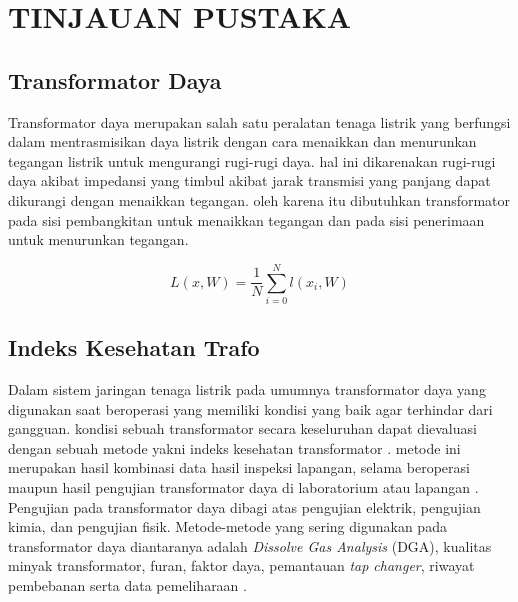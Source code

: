 \chapter{TINJAUAN PUSTAKA}
\label{BAB2:tinjauan}
\section{Transformator Daya}

Transformator daya merupakan salah satu peralatan tenaga listrik yang berfungsi dalam mentrasmisikan daya listrik dengan cara menaikkan dan menurunkan tegangan listrik untuk mengurangi rugi-rugi daya. hal ini dikarenakan rugi-rugi daya akibat impedansi yang timbul akibat jarak transmisi yang panjang dapat dikurangi dengan menaikkan tegangan. oleh karena itu dibutuhkan transformator pada sisi pembangkitan untuk menaikkan tegangan dan pada sisi penerimaan untuk menurunkan tegangan.



\begin{equation}
  L(x,W)= \frac{1}{N}\sum\limits_{i=0}^{N} l(x_i,W)   
  \label{func:loss}
\end{equation}

\section{Indeks Kesehatan Trafo}
Dalam sistem jaringan tenaga listrik pada umumnya transformator daya yang digunakan saat beroperasi yang memiliki kondisi yang baik agar terhindar dari gangguan. kondisi sebuah transformator secara keseluruhan dapat dievaluasi dengan sebuah metode yakni indeks kesehatan transformator \cite{nurcahyanto2019analysis}. metode ini merupakan hasil kombinasi data hasil inspeksi lapangan, selama beroperasi maupun hasil pengujian transformator daya di laboratorium atau lapangan \cite{ortiz2016health}. Pengujian pada transformator daya dibagi atas pengujian elektrik, pengujian kimia, dan pengujian fisik. Metode-metode yang sering digunakan pada transformator daya diantaranya adalah \textit{Dissolve Gas Analysis} (DGA), kualitas minyak transformator, furan, faktor daya, pemantauan \textit{tap changer}, riwayat pembebanan serta data pemeliharaan \cite{jahromi2009approach}.

